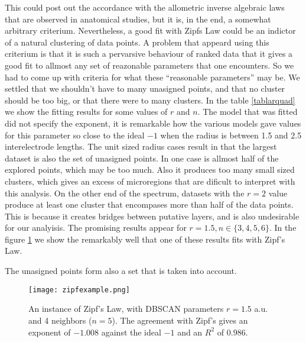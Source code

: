 \documentclass{article}
\begin{document}
This could post out
the accordance with the allometric inverse algebraic laws that are observed in
anatomical studies, but it is, in the end, a somewhat arbitrary criterium.
Nevertheless, a good
fit with Zipfs Law could be an indictor of a natural clustering of data points.
A problem that appeard using this criterium is that it is such a pervarsive
behaviour of ranked data
that it gives a good fit to allmost any set of reazonable parameters
that one encounters. So we had to come up with criteria for what these ``reasonable
parameters'' may be.  We settled that we shouldn't have to many unasigned points, and
that no cluster should be too big, or that there were to many clusters. In the
table \ref{tablarquad} we show the fitting results for some values of
$r$ and $n$. The model that was fitted did not specify the exponent, it
is remarkable how the various models gave values for this parameter so close
to the ideal $-1$ when the radius is between 1.5 and 2.5 interelectrode
lengths. The unit sized radius cases result in that the largest dataset
is also the set of unasigned points. In one case is allmost half of
the explored points, which may be too much. Also it produces too many
small sized clusters, which gives an excess of microregions
that are dificult to interpret with this analysis. On
the other end of the spectrum, datasets with the $r=2$ value
produce at least one cluster that encompases more than
half of the data points. This is because it creates bridges
between putative layers, and is also undesirable for our
analyisis. The promising results appear for $r=1.5,
n \in \lbrace 3,4,5,6 \rbrace$. In the figure \ref{zipfeg}
we show the remarkably well that one of these results fits
with Zipf's Law. 

The unasigned points form also a set that is taken into
account. 


\begin{figure}[h]
  \centering
  \texttt{[image: zipfexample.png]}
  \caption{An instance of Zipf's Law, with DBSCAN parameters
    $r=1.5$ a.u. and 4 neighbors ($n=5$). The agreement with Zipf's
    gives an exponent of $-1.008$ against the ideal $-1$ and
    an $R^2$ of $0.986$.} \label{zipfeg}
\end{figure}
\end{document}
